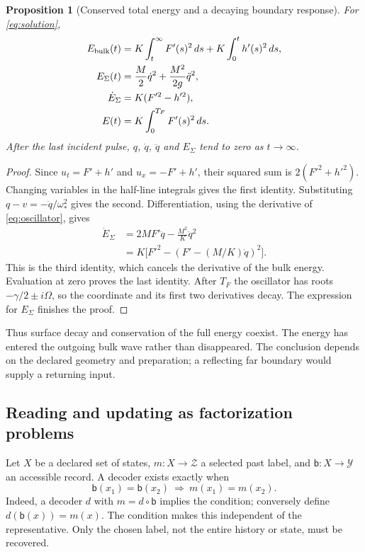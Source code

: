 \documentclass[11pt,a4paper]{article}
\newtheorem{proposition}{Proposition}[section]
\theoremstyle{remark}
\begin{document}
\begin{proposition}[Conserved total energy and a decaying boundary response]
\label{prop:energy}
For \eqref{eq:solution},
\begin{align}
 E_{\rm bulk}(t)&=K\int_t^\infty F'(s)^2\,ds
                   +K\int_0^t h'(s)^2\,ds,\\
 E_\Sigma(t)&=\frac M2\dot q^2+\frac{M^2}{2g}\ddot q^2,\\
 \dot E_\Sigma&=K(F'^2-h'^2),\\
 E(t)&=K\int_0^{T_F}F'(s)^2\,ds.
 \label{eq:balance}
\end{align}
After the last incident pulse, $q$, $\dot q$, $\ddot q$ and $E_\Sigma$
tend to zero as $t\to\infty$.
\end{proposition}
\begin{proof}
Since $u_t=F'+h'$ and $u_x=-F'+h'$, their squared sum is
$2(F'^2+h'^2)$. Changing variables in the half-line integrals gives
the first identity. Substituting $q-v=-\ddot q/\omega_*^2$ gives the
second. Differentiation, using the derivative of
\eqref{eq:oscillator}, gives
\begin{align*}
 \dot E_\Sigma&=2M F'\ddot q-\frac{M^2}{K}\ddot q^2\\
              &=K\bigl[F'^2-(F'-(M/K)\ddot q)^2\bigr].
\end{align*}
This is the third identity, which cancels the derivative of the bulk
energy. Evaluation at zero proves the last identity. After $T_F$ the
oscillator has roots $-\gamma/2\pm i\Omega$, so the coordinate and its
first two derivatives decay. The expression for $E_\Sigma$ finishes the proof.
\end{proof}

Thus surface decay and conservation of the full energy coexist. The
energy has entered the outgoing bulk wave rather than disappeared.
The conclusion depends on the declared geometry and preparation; a
reflecting far boundary would supply a returning input.

\subsection{Reading and updating as factorization problems}

Let $X$ be a declared set of states, $m:X\to\mathcal Z$ a selected past
label, and $\mathsf b:X\to\mathcal Y$ an accessible record. A decoder
exists exactly when
\begin{equation}
 \mathsf b(x_1)=\mathsf b(x_2)\ \Longrightarrow\ m(x_1)=m(x_2).
 \label{eq:reading-fibre}
\end{equation}
Indeed, a decoder $d$ with $m=d\circ\mathsf b$ implies the condition;
conversely define $d(\mathsf b(x))=m(x)$. The condition makes this
independent of the representative. Only the chosen label, not the entire
history or state, must be recovered.
\end{document}
